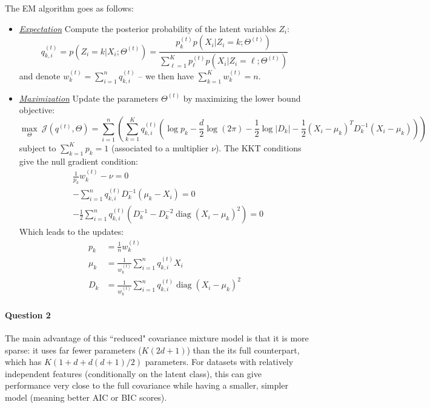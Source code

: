 \documentclass[11pt]{article}
\DeclareMathOperator{\diag}{\mathrm{diag}}
\begin{document}
The EM algorithm goes as follows:
\begin{itemize}
	\item \textit{\underline{Expectation}} Compute the posterior probability of the latent variables $Z_i$:
	\begin{equation}
	q^{(t)}_{k,i} = p(Z_i = k|X_i;\Theta^{(t)}) =
	\frac{
		p^{(t)}_k p(X_i|Z_i=k; \Theta^{(t)})
	}{
		\sum_{\ell=1}^K p^{(t)}_\ell p(X_i|Z_i=\ell; \Theta^{(t)})
	}
	\end{equation}
	and denote $w_k^{(t)} = \sum_{i=1}^n q_{k,i}^{(t)}$ -- we then have $\sum_{k=1}^K w_k^{(t)} = n$.
	\item \textit{\underline{Maximization}} Update the parameters $\Theta^{(t)}$ by maximizing the lower bound objective:
	\begin{equation}
	\max_{\Theta}~
	\mathcal{J}(q^{(t)}, \Theta) =
	\sum_{i=1}^n \left(
	\sum_{k=1}^K q^{(t)}_{k,i}
	\left(
		\log p_k
		- \frac{d}{2}\log(2\pi)
		- \frac{1}{2}\log{|D_k|}
		- \frac{1}{2}(X_i - \mu_k)^T D_k^{-1}(X_i-\mu_k)
	\right)
	\right)
	\end{equation}
	subject to $\sum_{k=1}^K p_k = 1$ (associated to a multiplier $\nu$). The KKT conditions give the null gradient condition:
	\begin{subequations}
	\begin{align}
		& \frac{1}{p_k} w_k^{(t)} - \nu = 0  \\
		& -\sum_{i=1}^n q_{k,i}^{(t)}D_k^{-1}(\mu_k - X_i) = 0  \\
		& -\frac{1}{2}
		\sum_{i=1}^n q_{k,i}^{(t)}
		(D_k^{-1} - D_k^{-2}\diag(X_i-\mu_k)^2) = 0
	\end{align}
	\end{subequations}
	Which leads to the updates:
	\begin{subequations}\label{eq:DiagEMupdate}
	\begin{align}
		p_k &= \frac{1}{n}w_k^{(t)}  \\
		\mu_k &= \frac{1}{w_k^{(t)}}
		\sum_{i=1}^n q_{k,i}^{(t)} X_i  \\
		D_k &= \frac{1}{w_k^{(t)}}
		\sum_{i=1}^n q_{k,i}^{(t)} \diag(X_i-\mu_k)^2
	\end{align}
	\end{subequations}
\end{itemize}

\paragraph{Question 2} The main advantage of this ``reduced" covariance mixture model is that it is more sparse: it uses far fewer parameters ($K(2d+1)$) than the its full counterpart, which has $K(1 + d + d(d+1)/2)$ parameters. For datasets with relatively independent features (conditionally on the latent class), this can give performance very close to the full covariance while having a smaller, simpler model (meaning better AIC or BIC scores).
\end{document}
